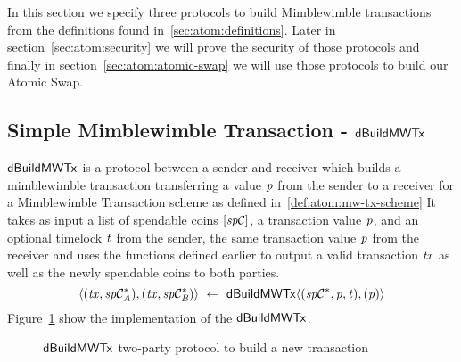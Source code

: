 In this section we specify three protocols to build Mimblewimble transactions from the definitions found in~\ref{sec:atom:definitions}.
Later in section~\ref{sec:atom:security} we will prove the security of those protocols and finally in section~\ref{sec:atom:atomic-swap} we will use those protocols to build our Atomic Swap.

\subsection{Simple Mimblewimble Transaction - $\mathsf{dBuildMWTx}$} \label{subsec:atom:simple-mw-tx}

$\mathsf{dBuildMWTx}$ is a protocol between a sender and receiver which builds a mimblewimble transaction transferring a value $\mathit{p}$ from the sender to a receiver for a Mimblewimble Transaction scheme as defined in~\ref{def:atom:mw-tx-scheme}
It takes as input a list of spendable coins $[\mathit{sp}\mathcal{C}]$, a transaction value $\mathit{p}$, and an optional timelock $\mathit{t}$ from the sender, the same transaction value $\mathit{p}$ from the receiver and uses the functions defined earlier to output a valid transaction $\mathit{tx}$ as well as the newly spendable coins to both parties.
\[ \langle (\mathit{tx}, \mathit{sp}\mathcal{C}_{\mathit{A}}^*), (\mathit{tx}, \mathit{sp}\mathcal{C}_{\mathit{B}}^*) \rangle ~\leftarrow~ \mathsf{dBuildMWTx} \langle(\mathit{sp}\mathcal{C}^*,\mathit{p},\mathit{t}), (\mathit{p})\rangle \]
Figure~\ref{fig:d-build-mw-tx} show the implementation of the $\mathsf{dBuildMWTx}$.

\begin{figure}
    \caption{$\mathsf{dBuildMWTx}$ two-party protocol to build a new transaction} \label{fig:d-build-mw-tx}
\end{figure}

